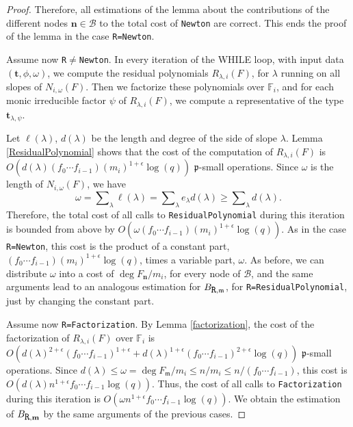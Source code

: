\documentclass{amsart}
\begin{document}
\begin{proof}
Therefore, all estimations of the lemma about the contributions of the different nodes ${\mathbf{n}}\in{{\mathcal B}}$ to the total cost of {\tt Newton} are correct. This ends the proof of the lemma in the case  {\tt R=Newton}.

Assume now  {\tt R$\ne$Newton}. In every iteration of the WHILE
 loop, with input data $({\mathbf{t}},\phi,\omega)$, we compute the residual polynomials
$R_{\lambda,i}(F)$, for $\lambda$ running on all slopes of $N_{i,\omega}(F)$. Then we 
factorize these polynomials over ${\mathbb F}_i$, and for each monic irreducible factor $\psi$ of $R_{\lambda,i}(F)$, we compute a representative of the type ${\mathbf{t}}_{\lambda,\psi}$. 

Let $\ell(\lambda)$, $d(\lambda)$ be the length and degree of the side of slope $\lambda$. Lemma \ref{ResidualPolynomial} shows that the cost of the computation of $R_{\lambda,i}(F)$ is $O\left(d(\lambda)(f_0\cdots f_{i-1})(m_i)^{1+\epsilon}\log(q)\right)$ ${\mathfrak{p}}$-small operations. Since $\omega$ is the length of $N_{i,\omega}(F)$, we have 
$$
\omega=\sum\nolimits_{\lambda}\ell(\lambda)=\sum\nolimits_{\lambda}e_\lambda d(\lambda)\ge \sum\nolimits_{\lambda}d(\lambda).
$$ 
Therefore, the total cost of all calls to {\tt ResidualPolynomial} during this iteration is bounded from above by $O\left(\omega(f_0\cdots f_{i-1})(m_i)^{1+\epsilon}\log(q)\right)$. As in the case {\tt R=Newton}, this cost is the product of a constant part, $(f_0\cdots f_{i-1})(m_i)^{1+\epsilon}\log(q)$, times a variable part, $\omega$. As before, we can distribute $\omega$ into a cost of $\deg F_{\mathbf{n}}/m_i$, for every node of ${{\mathcal B}}$, and the same arguments lead to an analogous estimation for $B_{\mbox{\tt R},{{\mathfrak m}}}$, for {\tt R=ResidualPolynomial}, just by changing the constant part.   

Assume now  {\tt R=Factorization}. By Lemma \ref{factorization}, the cost of the factorization of $R_{\lambda,i}(F)$ over ${\mathbb F}_i$ is $O\left(d(\lambda)^{2+\epsilon}(f_0\cdots f_{i-1})^{1+\epsilon}+d(\lambda)^{1+\epsilon}(f_0\cdots f_{i-1})^{2+\epsilon}\log(q)\right)$  ${\mathfrak{p}}$-small operations.
Since $d(\lambda)\le \omega=\deg F_{{\mathfrak m}}/m_i\le n/m_i\le n/(f_0\cdots f_{i-1})$, this cost is $O\left(d(\lambda)n^{1+\epsilon}f_0\cdots f_{i-1}\log(q)\right)$.
Thus, the cost of all calls to {\tt Factorization} during this iteration is $O\left(\omega n^{1+\epsilon}f_0\cdots f_{i-1}\log(q)\right)$.
We obtain the estimation of $B_{\mbox{\tt R},{\mathbf{m}}}$ by the same arguments of the previous cases.


\end{proof}
\end{document}
